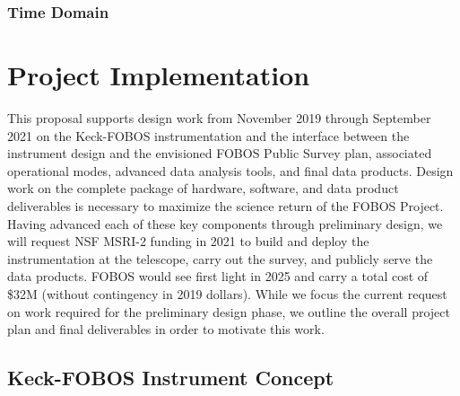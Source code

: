 \documentclass[oneside,11pt]{amsart}
\newcommand{\comment}[2][todo]{{\color{#1}[[{\bf #2}]]}}
\begin{document}


\subsubsection{Time Domain}
\label{sec:timedomain}
\noindent \comment{1/2 page}



\section{Project Implementation}
\label{sec:project}

This proposal supports design work from November 2019 through September 2021 on the Keck-FOBOS instrumentation and the
interface between the instrument design and the envisioned FOBOS Public Survey plan, associated operational modes,
advanced data analysis tools, and final data products.  Design work on the complete package of hardware, software, and
data product deliverables is necessary to maximize the science return of the FOBOS Project.  Having advanced each of
these key components through preliminary design, we will request NSF MSRI-2 funding in 2021 to build and deploy the
instrumentation at the telescope, carry out the survey, and publicly serve the data products.  FOBOS would see first
light in 2025 and carry a total cost of \$32M (without contingency in 2019 dollars).  While we focus the current
request on work required for the preliminary design phase, we outline the overall project plan and final deliverables
in order to motivate this work.

\subsection{Keck-FOBOS Instrument Concept}
\label{sec:concept}
\noindent \comment{1 page}
\end{document}
